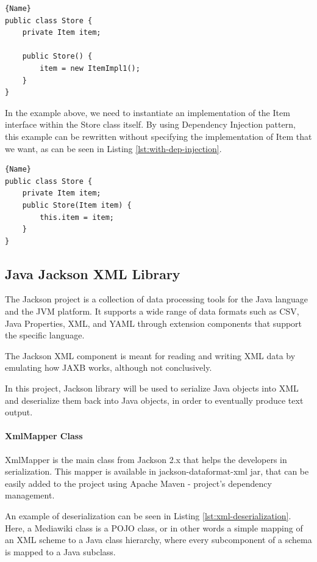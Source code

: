 \documentclass[thesis=M,english,hidelinks]{FITthesis}[2019/12/23]
\begin{document}
\begin{lstlisting}[caption=Example class without a Dependency Injection,frame=tlrb,  label = {lst:no-dep-injection}]{Name}
public class Store {
	private Item item;

	public Store() {
		item = new ItemImpl1();    
	}
}
\end{lstlisting}

In the example above, we need to instantiate an implementation of the Item interface within the Store class itself. By using Dependency Injection pattern, this example can be rewritten without specifying the implementation of Item that we want, as can be seen in Listing \ref{lst:with-dep-injection}.

\begin{lstlisting}[caption=Example class with a Dependency Injection,frame=tlrb,  label = {lst:with-dep-injection}]{Name}
public class Store {
	private Item item;
	public Store(Item item) {
		this.item = item;
	}
}
\end{lstlisting}

\subsection{Java Jackson XML Library}\label{jackson_library}

The Jackson project is a collection of data processing tools for the Java language and the \gls{JVM} platform. It supports a wide range of data formats such as \gls{CSV}, Java Properties, XML, and \gls{YAML} through extension components that support the specific language.

The Jackson XML component is meant for reading and writing XML data by emulating how \gls{JAXB} works, although not conclusively.

In this project, Jackson library will be used to serialize Java objects into XML and deserialize them back into Java objects, in order to eventually produce text output.

\paragraph{XmlMapper Class} 

XmlMapper is the main class from Jackson 2.x that helps the developers  in serialization. This mapper is available in jackson-dataformat-xml jar, that can be easily added to the project using Apache Maven - project's dependency management\cite{maven_project}.

An example of deserialization can be seen in Listing \ref{lst:xml-deserialization}. Here, a Mediawiki class is a \gls{POJO} class, or in other words a simple mapping of an XML scheme to a Java class hierarchy, where every subcomponent of a schema is mapped to a Java subclass.
\end{document}

